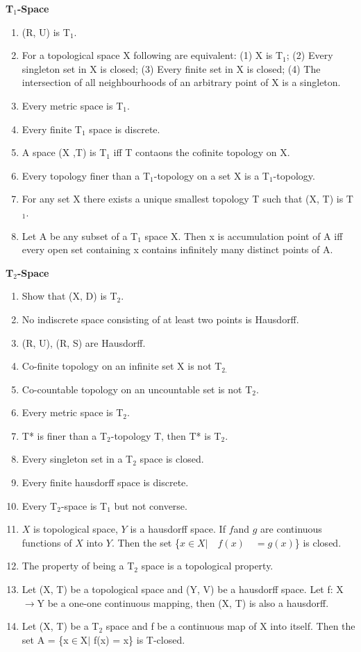 \documentclass[12pt]{amsart}
\begin{document}
\textbf{T}$_{1}$\textbf{-Space}

\begin{enumerate}
\item (R, U) is T$_{1}$.
\item For a topological space X following are equivalent: (1) X is T$_{1}$; (2) Every singleton set in X is closed; (3) Every finite set in X is closed; (4) The intersection of all neighbourhoods of an arbitrary point of X is a singleton.
\item Every metric space is T$_{1}$.
\item Every finite T$_{1}$ space is discrete.
\item A space (X ,T) is T$_{1}$ iff T contaons the cofinite topology on X.
\item Every topology finer than a T$_{1}$-topology on a set X is a T$_{1}$-topology.
\item For any set X there exists a unique smallest topology T such that (X, T) is T$_{1}$.
\item Let A be any subset of a T$_{1}$ space X. Then x is accumulation point of A iff every open set containing x contains infinitely many distinct points of A.
\end{enumerate}

\textbf{T}$_{2}$\textbf{-Space}

\begin{enumerate}
\item Show that (X, D) is T$_{2}$.
\item No indiscrete space consisting of at least two points is Hausdorff.
\item (R, U), (R, S) are Hausdorff.
\item Co-finite topology on an infinite set X is not T$_{2.}$
\item Co-countable topology on an uncountable set is not T$_{2}$.
\item Every metric space is T$_{2}$.
\item T* is finer than a T$_{2}$-topology T, then T* is T$_{2}$.
\item Every singleton set in a T$_{2}$ space is closed.
\item Every finite hausdorff space is discrete.
\item Every T$_{2}$-space is T$_{1}$ but not converse.
\item $X$ is topological space, $Y$ is a hausdorff space. If $f $and $g$ are continuous functions of $X$ into $Y$. Then the set {\{}$x\in X\vert  \quad f(x) \quad = g(x)${\}} is closed.
\item The property of being a T$_{2}$ space is a topological property.
\item Let (X, T) be a topological space and (Y, V) be a hausdorff space. Let f: X$\to $Y be a one-one continuous mapping, then (X, T) is also a hausdorff.
\item Let (X, T) be a T$_{2}$ space and f be a continuous map of X into itself. Then the set A = {\{}x$\in $X$\vert $ f(x) = x{\}} is T-closed.
\end{enumerate}
\end{document}
